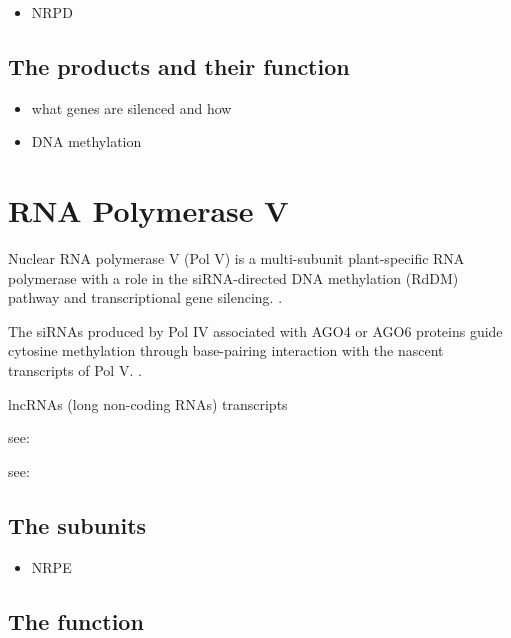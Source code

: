 \documentclass[a4paper, twocolumn]{article}
\begin{document}
\begin{itemize}
	\item NRPD

\end{itemize}

\subsection{The products and their function}


\begin{itemize}
	\item what genes are silenced and how
	\item DNA methylation 
\end{itemize}

\cite{PIKAARD2008}


\section{RNA Polymerase V}
Nuclear RNA polymerase V (Pol V) is a multi-subunit plant-specific RNA polymerase with a role in the siRNA-directed DNA methylation (RdDM) pathway and transcriptional gene silencing. \cite{ZHOU2015}.


The siRNAs produced by Pol IV associated with AGO4 or AGO6 proteins guide cytosine methylation through base-pairing interaction with the nascent transcripts of Pol V. \cite{Wierzbicki2009}.

lncRNAs (long non-coding RNAs) transcripts


see: \cite{Daxinger_2008}

see: \cite{wierzbick1}

\subsection{The subunits}
\cite{Wendte2017}
\cite{ZHOU2015}
\begin{itemize}
		\item NRPE
\end{itemize}


\cite{REAM2009}

\subsection{The function}
\end{document}

